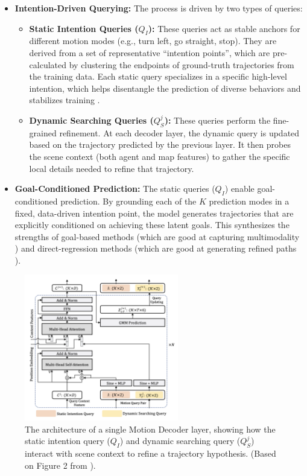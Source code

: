 \begin{itemize}
    \item \textbf{Intention-Driven Querying:} The process is driven by two types of queries:
    \begin{itemize}
        \item \textbf{Static Intention Queries ($Q_I$):} These queries act as stable anchors for different motion modes (e.g., turn left, go straight, stop). They are derived from a set of representative ``intention points'', which are pre-calculated by clustering the endpoints of ground-truth trajectories from the training data. Each static query specializes in a specific high-level intention, which helps disentangle the prediction of diverse behaviors and stabilizes training \cite{Shi2022MTR}.
        \item \textbf{Dynamic Searching Queries ($Q_S^j$):} These queries perform the fine-grained refinement. At each decoder layer, the dynamic query is updated based on the trajectory predicted by the previous layer. It then probes the scene context (both agent and map features) to gather the specific local details needed to refine that trajectory.
    \end{itemize}
    \item \textbf{Goal-Conditioned Prediction:} The static queries ($Q_I$) enable goal-conditioned prediction. By grounding each of the $K$ prediction modes in a fixed, data-driven intention point, the model generates trajectories that are explicitly conditioned on achieving these latent goals. This synthesizes the strengths of goal-based methods (which are good at capturing multimodality \cite{chai2019multipath}) and direct-regression methods (which are good at generating refined paths \cite{SceneTransformer2022}).
\end{itemize}

\begin{figure}[htbp]
    \centering
    \includegraphics[width=0.6\textwidth]{figures/decoder_layer_detail.png}
    \caption{The architecture of a single Motion Decoder layer, showing how the static intention query ($Q_I$) and dynamic searching query ($Q_S^j$) interact with scene context to refine a trajectory hypothesis. (Based on Figure 2 from \cite{Shi2022MTR}).}
    \label{fig:decoder_layer}
\end{figure}

